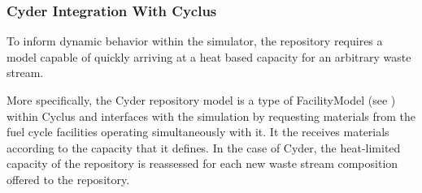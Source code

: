 \subsubsection{Cyder Integration With Cyclus}

To inform dynamic behavior within the simulator, the repository requires 
a model capable of quickly arriving at a heat based 
capacity for an arbitrary waste stream. 

More specifically, the Cyder repository model is a type of FacilityModel 
(see \cite{wilson_cyclus:_2012}) within 
Cyclus and interfaces with the simulation by requesting materials from the fuel 
cycle facilities operating simultaneously with it. It the receives materials 
according to the capacity that it defines. In the case of Cyder, the 
heat-limited capacity of the repository is reassessed for each new waste 
stream composition offered to the repository.


